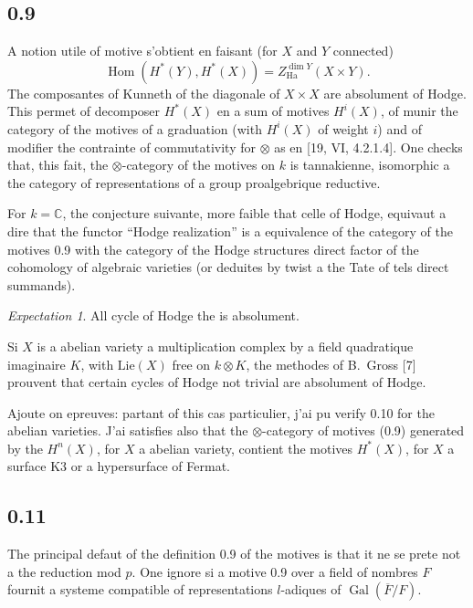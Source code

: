 \documentclass[12pt,a4paper]{article}
\theoremstyle{plain}
\theoremstyle{definition}
\theoremstyle{remark}
\newtheorem{hope}{Expectation}
\DeclareMathOperator{\Hom}{Hom}
\DeclareMathOperator{\Gal}{Gal}
\newcommand{\C}{\mathbb{C}}
\begin{document}
\subsection*{0.9}

A notion utile of motive s'obtient en faisant (for $X$ and $Y$ connected)
\[
\Hom(H^*(Y), H^*(X)) = Z^{\dim Y}_{\text{Ha}}(X \times Y).
\]
The composantes of Kunneth of the diagonale of $X \times X$ are absolument of Hodge.
This permet of decomposer $H^*(X)$ en a sum of motives $H^i(X)$, of munir the
category of the motives of a graduation (with $H^i(X)$ of weight $i$) and of modifier the
contrainte of commutativity for $\otimes$ as en [19, VI, 4.2.1.4]. One checks that, this
fait, the $\otimes$-category of the motives on $k$ is tannakienne, isomorphic a the category of representations of a group proalgebrique reductive.

For $k = \C$, the conjecture suivante, more faible that celle of Hodge, equivaut a dire
that the functor ``Hodge realization'' is a equivalence of the category of the motives
0.9 with the category of the Hodge structures direct factor of the cohomology of
algebraic varieties (or deduites by twist a the Tate of tels direct summands).

\begin{hope}\label{esp:0.10}
All cycle of Hodge the is absolument.
\end{hope}

Si $X$ is a abelian variety a multiplication complex by a field quadratique
imaginaire $K$, with $\text{Lie}(X)$ free on $k \otimes K$, the methodes of B.~Gross [7]
prouvent that certain cycles of Hodge not trivial are absolument of Hodge.

Ajoute on epreuves: partant of this cas particulier, j'ai pu verify 0.10 for the abelian varieties. J'ai satisfies also that the $\otimes$-category of motives (0.9) generated by the
$H^n(X)$, for $X$ a abelian variety, contient the motives $H^*(X)$, for $X$ a surface
K3 or a hypersurface of Fermat.

\subsection*{0.11}

The principal defaut of the definition 0.9 of the motives is that it ne se prete not a the
reduction mod $p$. One ignore si a motive 0.9 over a field of nombres $F$ fournit a
systeme compatible of representations $l$-adiques of $\Gal(\overline{F}/F)$.
\end{document}
